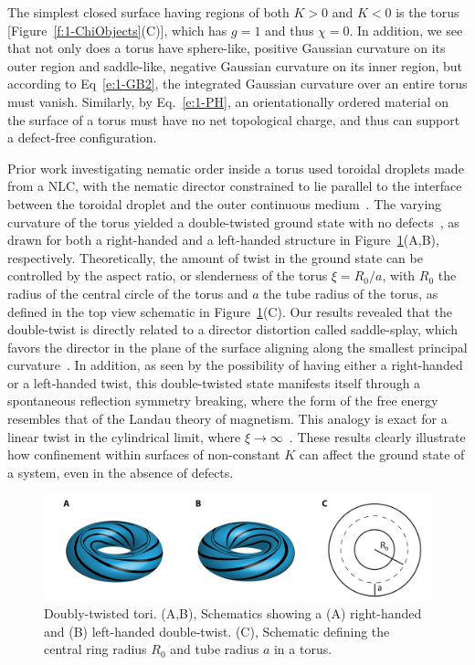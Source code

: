 The simplest closed surface having regions of both $K>0$ and $K<0$ is the torus [Figure~\ref{f:1-ChiObjects}(C)], which has $g = 1$ and thus $\chi = 0$.
In addition, we see that not only does a torus have sphere-like, positive Gaussian curvature on its outer region and saddle-like, negative Gaussian curvature on its inner region, but according to Eq~\ref{e:1-GB2}, the integrated Gaussian curvature over an entire torus must vanish.
Similarly, by Eq.~\ref{e:1-PH}, an orientationally ordered material on the surface of a torus must have no net topological charge, and thus can support a defect-free configuration.

Prior work investigating nematic order inside a torus used toroidal droplets made from a NLC, with the nematic director constrained to lie parallel to the interface between the toroidal droplet and the outer continuous medium~\cite{RN24,RN47}.
The varying curvature of the torus yielded a double-twisted ground state with no defects~\cite{RN24}, as drawn for both a right-handed and a left-handed structure in Figure~\ref{f:1-Torus}(A,B), respectively.
Theoretically, the amount of twist in the ground state can be controlled by the aspect ratio, or slenderness of the torus $\xi = R_0/a$, with $R_0$ the radius of the central circle of the torus and $a$ the tube radius of the torus, as defined in the top view schematic in Figure~\ref{f:1-Torus}(C).
Our results revealed that the double-twist is directly related to a director distortion called saddle-splay, which favors the director in the plane of the surface aligning along the smallest principal curvature~\cite{RN24,RN59}.
In addition, as seen by the possibility of having either a right-handed or a left-handed twist, this double-twisted state manifests itself through a spontaneous reflection symmetry breaking, where the form of the free energy resembles that of the Landau theory of magnetism.
This analogy is exact for a linear twist in the cylindrical limit, where $\xi \rightarrow \infty$~\cite{RN293}.
These results clearly illustrate how confinement within surfaces of non-constant $K$ can affect the ground state of a system, even in the absence of defects.
\begin{figure}
  \centering
  \includegraphics{figures/C1/Ch1-Figs_Torus.png}
  \caption{Doubly-twisted tori.
  (A,B), Schematics showing a (A) right-handed and (B) left-handed double-twist.
  (C), Schematic defining the central ring radius $R_0$ and tube radius $a$ in a torus.}\label{f:1-Torus}
\end{figure}

